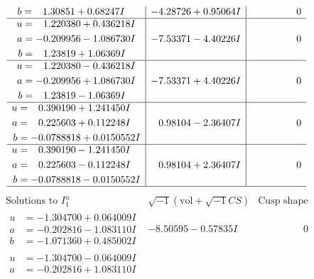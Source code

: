 \documentclass[1p]{elsarticle_modified}
\theoremstyle{definition}
\newcommand{\I}{\sqrt{-1}}
\begin{document}
$$\begin{array}{c|c|c}
\begin{aligned}
b &= \phantom{-}1.30851 + 0.68247 I\end{aligned}
 & -4.28726 + 0.95064 I & \phantom{-0.000000 } 0 \\ \hline\begin{aligned}
u &= \phantom{-}1.220380 + 0.436218 I \\
a &= -0.209956 - 1.086730 I \\
b &= \phantom{-}1.23819 + 1.06369 I\end{aligned}
 & -7.53371 - 4.40226 I & \phantom{-0.000000 } 0 \\ \hline\begin{aligned}
u &= \phantom{-}1.220380 - 0.436218 I \\
a &= -0.209956 + 1.086730 I \\
b &= \phantom{-}1.23819 - 1.06369 I\end{aligned}
 & -7.53371 + 4.40226 I & \phantom{-0.000000 } 0 \\ \hline\begin{aligned}
u &= \phantom{-}0.390190 + 1.241450 I \\
a &= \phantom{-}0.225603 + 0.112248 I \\
b &= -0.0788818 + 0.0150552 I\end{aligned}
 & \phantom{-}0.98104 - 2.36407 I & \phantom{-0.000000 } 0 \\ \hline\begin{aligned}
u &= \phantom{-}0.390190 - 1.241450 I \\
a &= \phantom{-}0.225603 - 0.112248 I \\
b &= -0.0788818 - 0.0150552 I\end{aligned}
 & \phantom{-}0.98104 + 2.36407 I & \phantom{-0.000000 } 0\\
 \hline 
 \end{array}$$\newpage$$\begin{array}{c|c|c}  
\text{Solutions to }I^u_{1}& \I (\text{vol} + \sqrt{-1}CS) & \text{Cusp shape}\\
 \hline 
\begin{aligned}
u &= -1.304700 + 0.064009 I \\
a &= -0.202816 - 1.083110 I \\
b &= -1.071360 + 0.485002 I\end{aligned}
 & -8.50595 - 0.57835 I & \phantom{-0.000000 } 0 \\ \hline\begin{aligned}
u &= -1.304700 - 0.064009 I \\
a &= -0.202816 + 1.083110 I \\

\end{aligned}
\end{array}$$
\end{document}
